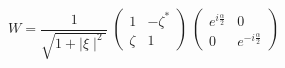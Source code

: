\begin{equation}
W = \frac{1}{\sqrt{1+\mid \xi \mid^{2}}}~
\left(
\begin{array}{cc}
1 & -\zeta^{\ast}\\
\zeta & 1
\end{array}
\right)~\left(
\begin{array}{cc}
e^{i \frac{\alpha}{2}} & 0\\
0 & e^{-i\frac{\alpha}{2}}
\end{array}  \right)
\end{equation}

